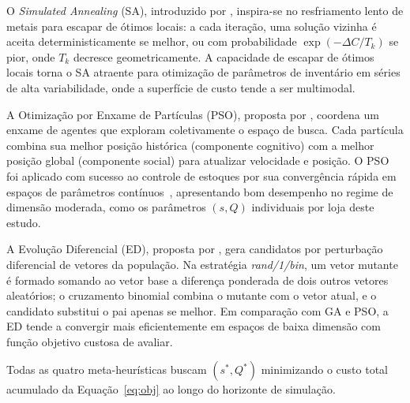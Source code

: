 \documentclass[a4paper,11pt]{article}
\begin{document}

O \textit{Simulated Annealing} (SA), introduzido por
\citet{kirkpatrick:1983}, inspira-se no resfriamento lento de metais
para escapar de ótimos locais: a cada iteração, uma solução vizinha é
aceita deterministicamente se melhor, ou com probabilidade
$\exp(-\Delta C / T_k)$ se pior, onde $T_k$ decresce geometricamente.
A capacidade de escapar de ótimos locais torna o SA atraente para
otimização de parâmetros de inventário em séries de alta variabilidade,
onde a superfície de custo tende a ser multimodal.


A Otimização por Enxame de Partículas (PSO), proposta por
\citet{kennedy:1995}, coordena um enxame de agentes que exploram
coletivamente o espaço de busca. Cada partícula combina sua melhor
posição histórica (componente cognitivo) com a melhor posição global
(componente social) para atualizar velocidade e posição. O PSO foi
aplicado com sucesso ao controle de estoques por sua convergência
rápida em espaços de parâmetros contínuos~\citep{anna:2006},
apresentando bom desempenho no regime de dimensão moderada, como os
parâmetros $(s, Q)$ individuais por loja deste estudo.


A Evolução Diferencial (ED), proposta por \citet{storn:1997}, gera
candidatos por perturbação diferencial de vetores da população. Na
estratégia \textit{rand/1/bin}, um vetor mutante é formado somando ao
vetor base a diferença ponderada de dois outros vetores aleatórios;
o cruzamento binomial combina o mutante com o vetor atual, e o
candidato substitui o pai apenas se melhor. Em comparação com GA e
PSO, a ED tende a convergir mais eficientemente em espaços de baixa
dimensão com função objetivo custosa de avaliar.

Todas as quatro meta-heurísticas buscam $(s^*, Q^*)$ minimizando o custo total acumulado
da Equação~\eqref{eq:obj} ao longo do horizonte de simulação.
\end{document}
